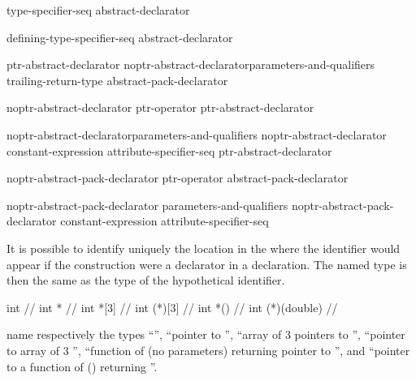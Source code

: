 \begin{bnf}
\br
    type-specifier-seq abstract-declarator\opt
\end{bnf}

\begin{bnf}
\br
    defining-type-specifier-seq abstract-declarator\opt
\end{bnf}

\begin{bnf}
\br
    ptr-abstract-declarator\br
    noptr-abstract-declarator\opt parameters-and-qualifiers trailing-return-type\br
    abstract-pack-declarator
\end{bnf}

\begin{bnf}
\br
    noptr-abstract-declarator\br
    ptr-operator ptr-abstract-declarator\opt
\end{bnf}

\begin{bnf}
\br
    noptr-abstract-declarator\opt parameters-and-qualifiers\br
    noptr-abstract-declarator\opt{} \terminal{[} constant-expression\opt{} \terminal{]} attribute-specifier-seq\opt\br
    \terminal{(} ptr-abstract-declarator \terminal{)}
\end{bnf}

\begin{bnf}
\br
    noptr-abstract-pack-declarator\br
    ptr-operator abstract-pack-declarator
\end{bnf}

\begin{bnf}
\br
    noptr-abstract-pack-declarator parameters-and-qualifiers\br
    noptr-abstract-pack-declarator \terminal{[} constant-expression\opt{} \terminal{]} attribute-specifier-seq\opt\br
\end{bnf}

It is possible to identify uniquely the location in the
where the identifier would appear if the construction were a declarator
in a declaration.
The named type is then the same as the type of the
hypothetical identifier.
\begin{example}
%
%
\begin{codeblock}
int                 // 
int *               // 
int *[3]            // 
int (*)[3]          // 
int *()             // 
int (*)(double)     // 
\end{codeblock}
name respectively the types
``'',
``pointer to
'',
``array of 3 pointers to
'',
``pointer to array of 3
'',
``function of (no parameters) returning pointer to
'',
and ``pointer to a function of
()
returning
''.
\end{example}

